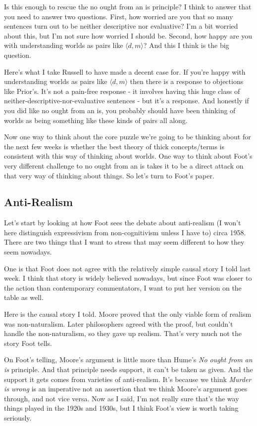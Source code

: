 \documentclass[
]{article}
\begin{document}
Is this enough to rescue the no ought from an is principle? I think to
answer that you need to answer two questions. First, how worried are you
that so many sentences turn out to be neither descriptive nor
evaluative? I'm a bit worried about this, but I'm not sure how worried I
should be. Second, how happy are you with understanding worlds as pairs
like \(\langle d, m \rangle\)? And this I think is the big question.

Here's what I take Russell to have made a decent case for. If you're
happy with understanding worlds as pairs like \(\langle d, m \rangle\)
then there is a response to objections like Prior's. It's not a
pain-free response - it involves having this huge class of
neither-descriptive-nor-evaluative sentences - but it's a response. And
honestly if you did like no ought from an is, you probably should have
been thinking of worlds as being something like these kinds of pairs all
along.

Now one way to think about the core puzzle we're going to be thinking
about for the next few weeks is whether the best theory of thick
concepts/terms is consistent with this way of thinking about worlds. One
way to think about Foot's very different challenge to no ought from an
is takes it to be a direct attack on that very way of thinking about
things. So let's turn to Foot's paper.

\hypertarget{anti-realism}{%
\subsection{Anti-Realism}\label{anti-realism}}

Let's start by looking at how Foot sees the debate about anti-realism (I
won't here distinguish expressivism from non-cognitivism unless I have
to) circa 1958. There are two things that I want to stress that may seem
different to how they seem nowadays.

One is that Foot does not agree with the relatively simple causal story
I told last week. I think that story is widely believed nowadays, but
since Foot was closer to the action than contemporary commentators, I
want to put her version on the table as well.

Here is the causal story I told. Moore proved that the only viable form
of realism was non-naturalism. Later philosophers agreed with the proof,
but couldn't handle the non-naturalism, so they gave up realism. That's
very much not the story Foot tells.

On Foot's telling, Moore's argument is little more than Hume's \emph{No
ought from an is} principle. And that principle needs support, it can't
be taken as given. And the support it gets comes from varieties of
anti-realism. It's because we think \emph{Murder is wrong} is an
imperative not an assertion that we think Moore's argument goes through,
and not vice versa. Now as I said, I'm not really sure that's the way
things played in the 1920s and 1930s, but I think Foot's view is worth
taking seriously.
\end{document}
